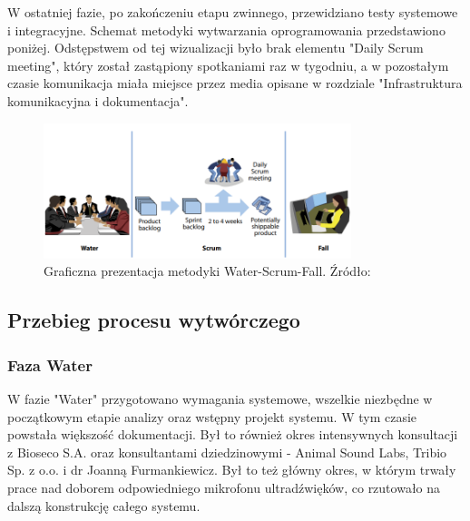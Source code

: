 \documentclass{sprz}
\begin{document}
W ostatniej fazie, po zakończeniu etapu zwinnego, przewidziano testy systemowe i integracyjne. Schemat metodyki wytwarzania oprogramowania przedstawiono poniżej. Odstępstwem od tej wizualizacji było brak elementu "Daily Scrum meeting", który został zastąpiony spotkaniami raz w tygodniu, a w pozostałym czasie komunikacja miała miejsce przez media opisane w rozdziale "Infrastruktura komunikacyjna i dokumentacja". 

\begin{figure}[h]
  \centering
  \includegraphics[width=0.8\textwidth]{sprz/water-scrum-fall.png}
  \caption{Graficzna prezentacja metodyki Water-Scrum-Fall. Źródło: \cite{water-scrum-fall1}}
  \label{img:water-scrum-fall}
\end{figure}

\subsection{Przebieg procesu wytwórczego}

\subsubsection{Faza Water}
W fazie "Water" przygotowano wymagania systemowe, wszelkie niezbędne w początkowym etapie analizy oraz wstępny projekt systemu. W tym czasie powstała większość dokumentacji. Był to również okres intensywnych konsultacji z Bioseco S.A. oraz konsultantami dziedzinowymi - Animal Sound Labs, Tribio Sp. z o.o. i dr Joanną Furmankiewicz. Był to też główny okres, w którym trwały prace nad doborem odpowiedniego mikrofonu ultradźwięków, co rzutowało na dalszą konstrukcję całego systemu.
\end{document}
